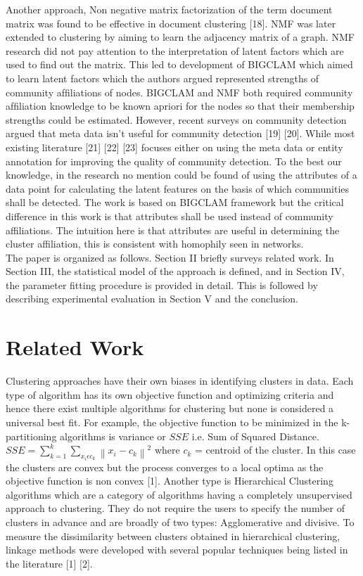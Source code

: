 \documentclass[conference]{IEEEtran}
\begin{document}
Another approach, Non negative matrix factorization of the
term document matrix was found to be effective in document
clustering [18]. NMF was later extended to clustering by
aiming to learn the adjacency matrix of a graph. NMF
research did not pay attention to the interpretation of latent
factors which are used to ﬁnd out the matrix. This led to
development of BIGCLAM which aimed to learn latent
factors which the authors argued represented strengths of
community afﬁliations of nodes. BIGCLAM and NMF both
required community afﬁliation knowledge to be known apriori
for the nodes so that their membership strengths could be
estimated. However, recent surveys on community detection
argued that meta data isn’t useful for community detection
[19] [20]. While most existing literature [21] [22] [23]
focuses either on using the meta data or entity annotation for
improving the quality of community detection. To the best
our knowledge, in the research no mention could be found
of using the attributes of a data point for calculating the
latent features on the basis of which communities shall be
detected. The work is based on BIGCLAM framework but
the critical difference in this work is that attributes shall be used instead of community affiliations. The intuition here is
that attributes are useful in determining the cluster affiliation,
this is consistent with homophily seen in networks.\\

The paper is organized as follows. Section II briefly surveys
related work. In Section III, the statistical model of the
approach is defined, and in Section IV, the parameter fitting
procedure is provided in detail. This is followed by describing
experimental evaluation in Section V and the conclusion.\\

\section{Related Work}

Clustering approaches have their own biases in identifying
clusters in data. Each type of algorithm has its own objective
function and optimizing criteria and hence there exist multiple
algorithms for clustering but none is considered a universal
best ﬁt. For example, the objective function to be minimized
in the k-partitioning algorithms is variance or $SSE$ i.e. Sum of Squared Distance. $  SSE = \sum_{k=1}^{k} \sum_{x_i \epsilon c_k} \left \| x_i - c_k \right \| ^2 $ where $c_k$ = centroid of the cluster. In this case the clusters are convex
but the process converges to a local optima as the objective
function is non convex [1]. Another type is Hierarchical
Clustering algorithms which are a category of algorithms
having a completely unsupervised approach to clustering.
They do not require the users to specify the number of clusters
in advance and are broadly of two types: Agglomerative
and divisive. To measure the dissimilarity between clusters
obtained in hierarchical clustering, linkage methods were
developed with several popular techniques being listed in the
literature [1] [2]. \\
\end{document}
